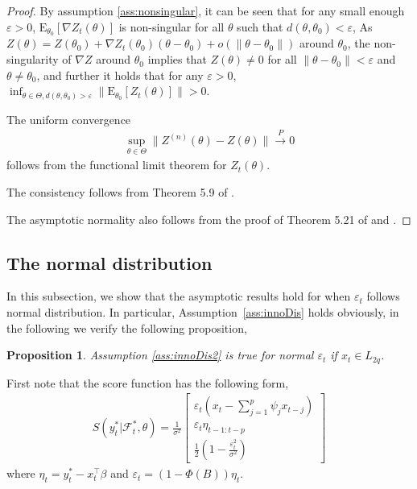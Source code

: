\documentclass[a4paper,12pt]{article}
\newcommand{\E}{\mathop{\mathbb{E}}}
\def \trans{^\intercal}
\def \inprob {\stackrel{P}{\longrightarrow}}
\def \E{\mbox{E}}
\def \F {\mathcal{F}}
\newtheorem{proposition}[theorem]{Proposition}
\begin{document}
\begin{proof}
By assumption \ref{ass:nonsingular}, it can be seen that for any small enough $\varepsilon>0$,
$\E_{\theta_0}\left[ \nabla Z_t(\theta) \right]$ is non-singular for all $\theta$ such that
$d(\theta,\theta_0)<\varepsilon$,
As $Z(\theta) = Z(\theta_0) + \nabla Z_t(\theta_0)(\theta - \theta_0) + o(\|\theta - \theta_0\|)$
around $\theta_0$, the non-singularity of $\nabla Z$ around $\theta_0$ implies that $Z(\theta)\ne 0$
for all $\|\theta-\theta_0\|<\varepsilon$ and $\theta \ne \theta_0$, and further it holds that for 
any $\varepsilon>0$,
$\inf_{\theta \in \Theta, d(\theta,\theta_0)>\varepsilon}\|\E_{\theta_0}\left[ Z_t(\theta)
\right]\| > 0$.

The uniform convergence 
\begin{align*}
\sup_{\theta\in\Theta}\|Z^{(n)}(\theta)-Z(\theta)\|\inprob 0
\end{align*}
follows from the functional limit theorem for $Z_t(\theta)$.



The consistency follows from Theorem 5.9 of \citet{vaart}.

The asymptotic normality also follows from the proof of Theorem 5.21 of
\citet{vaart} and \citet{ArconesYu1994}.



\end{proof}

\subsection{ The normal distribution}
In this subsection, we show that the asymptotic results hold for when $\varepsilon_t$ follows normal distribution. In particular, Assumption~\ref{ass:innoDis} holds obviously, in the following we verify the following proposition,
\begin{proposition}
Assumption \ref{ass:innoDis2} is true for normal $\varepsilon_t$ if $x_t\in L_{2q}$.
\label{prop:normal}
\end{proposition}

First note that the score function has the following form,
\begin{align*}
S(y_t^*|\F_t^*,\theta)
=\frac{1}{\sigma^2}
\left[\begin{array}{c}
\varepsilon_t(x_t - \sum_{j=1}^p \psi_j x_{t-j})\\
\varepsilon_t\eta_{t-1:t-p}\\
\frac{1}{2}\left(1 - \frac{\varepsilon_t^2}{\sigma^2} \right)
\end{array} \right]
\end{align*}
where $\eta_t = y_{t}^* - x_t\trans \beta$ and $\varepsilon_t = (1-\Phi(B))\eta_t$. 
\end{document}
